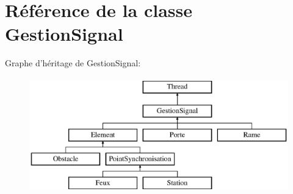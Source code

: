 \hypertarget{classGestionSignal}{
\section{Référence de la classe GestionSignal}
\label{classGestionSignal}
}
Graphe d'héritage de GestionSignal:\begin{figure}[H]
\begin{center}
\leavevmode
\includegraphics[height=5cm]{classGestionSignal}
\end{center}
\end{figure}
